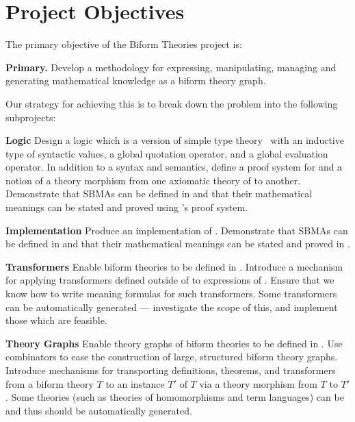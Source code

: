 \documentclass[fleqn]{llncs}
\begin{document}
\section{Project Objectives}

The primary objective of the Biform Theories project is:

\bi

  \item[] \textbf{Primary.} Develop a methodology for expressing,
    manipulating, managing and generating mathematical knowledge 
    as a biform theory graph.

\ei

\noindent
Our strategy for achieving this is to break down the problem
into the following subprojects:

\bi

  \item[]\textbf{Logic} Design a logic  which is a
    version of simple type theory~\cite{Farmer08} with an inductive
    type of syntactic values, a global quotation operator, and a
    global evaluation operator.  In addition to a syntax and
    semantics, define a proof system for  and a notion of a
    theory morphism from one axiomatic theory of  to
    another.  Demonstrate that SBMAs can be defined in  and
    that their mathematical meanings can be stated and proved using
    's proof system.

\medskip

  \item[]\textbf{Implementation} Produce an implementation  of
    .  Demonstrate that SBMAs can be defined in
     and that their mathematical meanings can be stated
    and proved in .

\medskip

  \item[]\textbf{Transformers} Enable biform theories to be defined in
    .  Introduce a mechanism for applying transformers
    defined outside of  to expressions of .
    Ensure that we know how to write meaning formulas for such
    transformers. Some transformers can be automatically generated
    --- investigate the scope of this, and implement those which
    are feasible.

\medskip

  \item[]\textbf{Theory Graphs} Enable theory graphs of biform
    theories to be defined in .  Use combinators to ease
    the construction of large, structured biform theory graphs.
    Introduce mechanisms for transporting definitions, theorems, and
    transformers from a biform theory $T$ to an instance $T'$ of $T$
    via a theory morphism from $T$ to $T'$. Some theories (such as
    theories of homomorphisms and term languages) can be and thus
    should be automatically generated.
\end{document}
